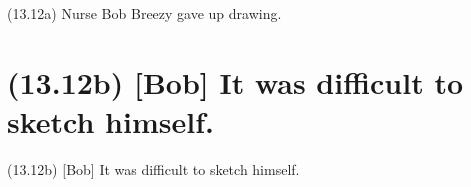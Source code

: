 \documentclass{article}
\begin{document}
\bigbreak
\begin{enumerate*}
\item[(13.12a)] Nurse Bob Breezy gave up drawing.
\end{enumerate*}
\bigbreak

\bigbreak
\begin{minipage}{\textwidth}
\end{minipage}
\bigbreak

\clearpage

%
%

\section*{(13.12b) [Bob] It was difficult to sketch himself.}

\bigbreak
\begin{enumerate*}
\item[(13.12b)] [Bob] It was difficult to sketch himself.
\end{enumerate*}
\bigbreak

\bigbreak
\begin{minipage}{\textwidth}
\end{minipage}
\bigbreak

\clearpage

%
%
\end{document}
